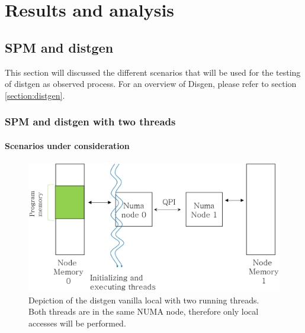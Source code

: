 \chapter{Results and analysis}\label{chapter:res-analysis}

\section{SPM and distgen}\label{section:spmydistgen}
This section will discussed the different scenarios that will be used for the testing of distgen as observed process. For an overview of Disgen, please refer to section \ref{section:distgen}.
\subsection{SPM and distgen with two threads}\label{subsection:spmydistgen-2t}

\subsubsection{Scenarios under consideration}\label{subsection:spmydistgen-2t-scens}

\begin{figure}
	\centering
		\includegraphics[width=.8\textwidth]{figures/distgentt-local.eps}
		\caption[Depiction of the working of the distgen vanilla local scenario with two threads]{Depiction of the distgen vanilla local with two running threads. Both threads are in the same NUMA node, therefore only local accesses will be performed.}
		\label{fig:dgentt-local}
\end{figure}

